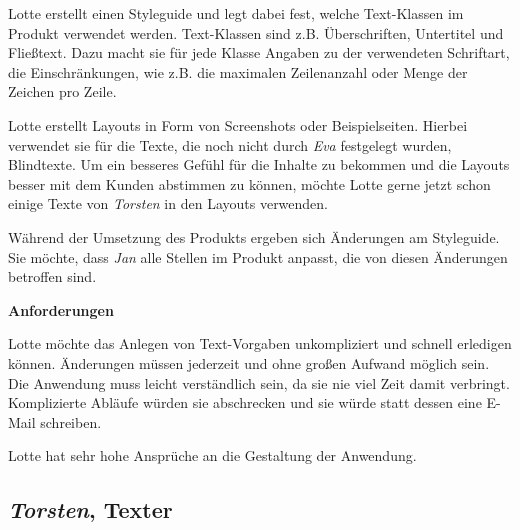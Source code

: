 \begin{multicols}{2}
Lotte erstellt einen Styleguide und legt dabei fest, welche Text-Klassen im Produkt verwendet werden. Text-Klassen sind z.B. Überschriften, Untertitel und Fließtext. Dazu macht sie für jede Klasse Angaben zu der verwendeten Schriftart, die Einschränkungen, wie z.B. die maximalen Zeilenanzahl oder Menge der Zeichen pro Zeile.

Lotte erstellt Layouts in Form von Screenshots oder Beispielseiten. Hierbei verwendet sie für die Texte, die noch nicht durch \emph{Eva} festgelegt wurden, Blindtexte. Um ein besseres Gefühl für die Inhalte zu bekommen und die Layouts besser mit dem Kunden abstimmen zu können, möchte Lotte gerne jetzt schon einige Texte von \emph{Torsten} in den Layouts verwenden.

Während der Umsetzung des Produkts ergeben sich Änderungen am Styleguide. Sie möchte, dass \emph{Jan} alle Stellen im Produkt anpasst, die von diesen Änderungen betroffen sind.

\textbf{Anforderungen}

Lotte möchte das Anlegen von Text-Vorgaben unkompliziert und schnell erledigen können. Änderungen müssen jederzeit und ohne großen Aufwand möglich sein. Die Anwendung muss leicht verständlich sein, da sie nie viel Zeit damit verbringt. Komplizierte Abläufe würden sie abschrecken und sie würde statt dessen eine E-Mail schreiben.

Lotte hat sehr hohe Ansprüche an die Gestaltung der Anwendung.

\end{multicols}

\pagebreak

\subsection{\emph{Torsten}, Texter}\label{p:torsten}

